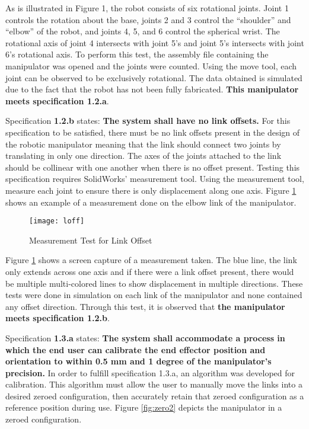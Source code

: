 As is illustrated in Figure 1, the robot consists of six rotational joints. Joint 1 controls the rotation about the base,  joints 2 and 3 control the “shoulder” and “elbow” of the robot, and joints 4, 5, and 6 control the  spherical wrist. The rotational axis of joint 4 intersects with joint 5’s and joint 5’s intersects with joint 6’s rotational axis. To perform this test, the assembly file containing the manipulator was opened and the joints were counted. Using the move tool, each joint can be observed to be exclusively rotational. The data obtained is simulated due to the fact that the robot has not been fully fabricated. \textbf{This manipulator meets specification 1.2.a}.

Specification \textbf{1.2.b} states: \textbf{The system shall have no link offsets.} For this specification to be satisfied, there must be no link offsets present in the design of the robotic manipulator meaning that the link should connect two joints by translating in only one direction. The axes of the joints attached to the link should be collinear with one another when there is no offset present. Testing this specification requires SolidWorks’ measurement tool. Using the measurement tool, measure each joint to ensure there is only displacement along one axis. Figure \ref{fig:loff} shows an example of a measurement done on the elbow link of the manipulator.

\begin{figure}[htp]
  \centering
  \texttt{[image: loff]}
  \caption{Measurement Test for Link Offset}
  \label{fig:loff}
\end{figure}

Figure \ref{fig:loff} shows a screen capture of a measurement taken. The blue line, the link only extends across one axis and if there were a link offset present, there would be multiple multi-colored lines to show displacement in multiple directions. These tests were done in simulation on each link of the manipulator and none contained any offset direction. Through this test, it is observed that \textbf{the manipulator meets specification 1.2.b}.

Specification \textbf{1.3.a} states: \textbf{The system shall accommodate a process in which the end user can calibrate the end effector position and orientation to within 0.5 mm and 1 degree of the manipulator’s precision.} In order to fulfill specification 1.3.a, an algorithm was developed for calibration. This algorithm must allow the user to manually move the links into a desired zeroed configuration, then accurately retain that zeroed configuration as a reference position during use. Figure \ref{fig:zero2} depicts the manipulator in a zeroed configuration.

